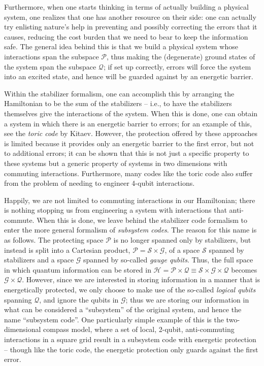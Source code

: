 \documentclass[twocolumn,showpacs,preprintnumbers,amsmath,amssymb,nofootinbib,pra,floatfix]{revtex4}
\begin{document}
Furthermore, when one starts thinking in terms of actually building a physical system, one realizes that one has another resource on their side:  one can actually try enlisting nature's help in preventing and possibly correcting the errors that it causes, reducing the cost burden that we need to bear to keep the information safe.  The general idea behind this is that we build a physical system whose interactions span the subspace $\mathscr{P}$, thus making the (degenerate) ground states of the system span the subspace $\mathscr{Q}$;  if set up correctly, errors will force the system into an excited state, and hence will be guarded against by an energetic barrier.

Within the stabilizer formalism, one can accomplish this by arranging the Hamiltonian to be the sum of the stabilizers -- i.e., to have the stabilizers themselves give the interactions of the system.  When this is done, one can obtain a system in which there is an energetic barrier to errors;  for an example of this, see  the \emph{toric code} by Kitaev.  However, the protection offered by these approaches is limited because it  provides only an energetic barrier to the first error, but not to additional errors; it can be shown that this is not just a specific property to these systems but a generic property of systems in two dimensions with commuting interactions.  Furthermore, many codes like the toric code also suffer from the problem of needing to engineer 4-qubit interactions.

Happily, we are not limited to commuting interactions in our Hamiltonian;  there is nothing stopping us from engineering a system with interactions that anti-commute.  When this is done, we leave behind the stabilizer code formalism to enter the more general formalism of \emph{subsystem codes}.  The reason for this name is as follows.  The protecting space $\mathscr{P}$ is no longer spanned only by stabilizers, but instead is split into a Cartesian product, $\mathscr{P}=\mathscr{S}\times\mathscr{G}$, of a space $\mathscr{S}$ spanned by stabilizers and a space $\mathscr{G}$ spanned by so-called \emph{gauge qubits}.  Thus, the full space in which quantum information can be stored in $\mathscr{H}=\mathscr{P}\times\mathscr{Q}\equiv\mathscr{S}\times\mathscr{G}\times\mathscr{Q}$ becomes $\mathscr{G}\times\mathscr{Q}$.  However, since we are interested in storing information in a manner that is energetically protected, we only choose to make use of the so-called \emph{logical qubits} spanning $\mathscr{Q}$, and ignore the qubits in $\mathscr{G}$;  thus we are storing our information in what can be considered a ``subsystem'' of the original system, and hence the name ``subsystem code''.  One particularly simple example of this is the two-dimensional compass model, where a set of local, 2-qubit, anti-commuting interactions in a square grid result in a subsystem code with energetic protection -- though like the toric code, the energetic protection only guards against the first error.
\end{document}
